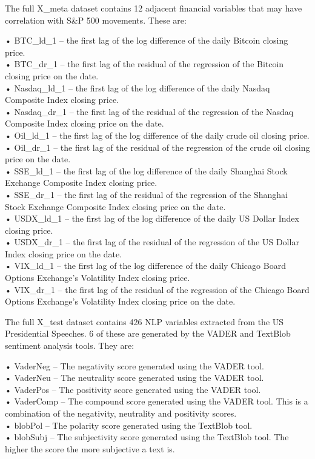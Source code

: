 \documentclass[11pt,preprint, authoryear]{elsarticle}
\numberwithin{equation}{section}
\numberwithin{figure}{section}
\numberwithin{table}{section}
\begin{document}
The full X\_meta dataset contains 12 adjacent financial variables that
may have correlation with S\&P 500 movements. These are:

• BTC\_ld\_1 -- the first lag of the log difference of the daily Bitcoin
closing price.\\
• BTC\_dr\_1 -- the first lag of the residual of the regression of the
Bitcoin closing price on the date.\\
• Nasdaq\_ld\_1 -- the first lag of the log difference of the daily
Nasdaq Composite Index closing price.\\
• Nasdaq\_dr\_1 -- the first lag of the residual of the regression of
the Nasdaq Composite Index closing price on the date.\\
• Oil\_ld\_1 -- the first lag of the log difference of the daily crude
oil closing price.\\
• Oil\_dr\_1 -- the first lag of the residual of the regression of the
crude oil closing price on the date.\\
• SSE\_ld\_1 -- the first lag of the log difference of the daily
Shanghai Stock Exchange Composite Index closing price.\\
• SSE\_dr\_1 -- the first lag of the residual of the regression of the
Shanghai Stock Exchange Composite Index closing price on the date.\\
• USDX\_ld\_1 -- the first lag of the log difference of the daily US
Dollar Index closing price.\\
• USDX\_dr\_1 -- the first lag of the residual of the regression of the
US Dollar Index closing price on the date.\\
• VIX\_ld\_1 -- the first lag of the log difference of the daily Chicago
Board Options Exchange's Volatility Index closing price.\\
• VIX\_dr\_1 -- the first lag of the residual of the regression of the
Chicago Board Options Exchange's Volatility Index closing price on the
date.

The full X\_test dataset contains 426 NLP variables extracted from the
US Presidential Speeches. 6 of these are generated by the VADER and
TextBlob sentiment analysis tools. They are:

• VaderNeg -- The negativity score generated using the VADER tool.\\
• VaderNeu -- The neutrality score generated using the VADER tool.\\
• VaderPos -- The positivity score generated using the VADER tool.\\
• VaderComp -- The compound score generated using the VADER tool. This
is a combination of the negativity, neutrality and positivity scores.\\
• blobPol -- The polarity score generated using the TextBlob tool.\\
• blobSubj -- The subjectivity score generated using the TextBlob tool.
The higher the score the more subjective a text is.
\end{document}
